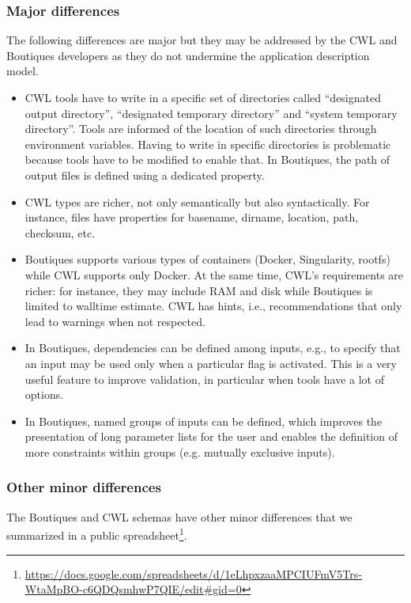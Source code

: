\documentclass{article}
\newcommand{\boutiques}{Boutiques\xspace}
\begin{document}
\subsubsection{Major differences}

The following differences are major but they may be addressed by the
CWL and \boutiques developers as they do not undermine the application
description model.

\begin{itemize}
\item CWL tools have to write in a specific set of directories called
``designated output directory'', ``designated temporary directory''
and ``system temporary directory''. Tools are informed of the location
of such directories through environment variables. Having to write in
specific directories is problematic because tools have to be modified
to enable that. In \boutiques, the path of output files is defined
using a dedicated property.
\item CWL types are richer, not only
semantically but also syntactically. For instance, files have
properties for basename, dirname, location, path, checksum, etc.
\item \boutiques supports various types of containers (Docker, Singularity,
rootfs) while CWL supports only Docker. At the same time, CWL’s
requirements are richer: for instance, they may include RAM and disk
while Boutiques is limited to walltime estimate. CWL has hints, i.e.,
recommendations that only lead to warnings when not respected.
\item In \boutiques, dependencies can be defined among inputs, e.g., to
specify that an input may be used only when a particular flag is
activated. This is a very useful feature to improve validation, in
particular when tools have a lot of options.
\item In \boutiques, named
groups of inputs can be defined, which improves the presentation of
long parameter lists for the user and enables the definition of more
constraints within groups (e.g. mutually exclusive inputs).
\end{itemize}

\subsubsection{Other minor differences}

The \boutiques and CWL schemas have other minor differences that we
summarized in a public
spreadsheet\footnote{\url{https://docs.google.com/spreadsheets/d/1eLhpxzaaMPCIUFmV5Trs-WtaMpBO-c6QDQsmhwP7QIE/edit\#gid=0}}.
\end{document}
